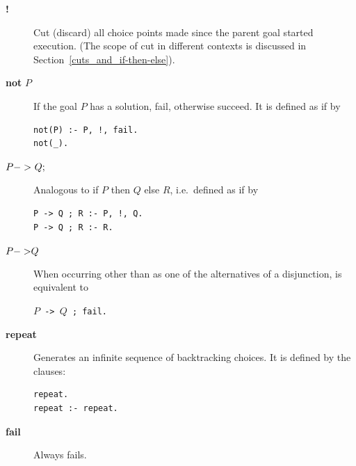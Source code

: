 \begin{description}
\item[{\bf !}] 
    Cut (discard) all choice points made since the parent goal
    started execution.
    (The scope of cut in different contexts is discussed
    in Section~\ref{cuts_and_if-then-else}).

\item[{\bf not} $P$] 
    If the goal $P$ has a solution, fail, otherwise succeed.
    It is defined as if by
\begin{center}
\begin{minipage}{1.75in}
\begin{verbatim}
not(P) :- P, !, fail.
not(_).
\end{verbatim}
\end{minipage}
\end{center}

\item[$P {\tt->}\ Q {\bf ;}$] 
    Analogous to if $P$ then $Q$ else $R$,
    i.e.\ defined as if by
\begin{center}
\begin{minipage}{2.00in}
\begin{verbatim}
P -> Q ; R :- P, !, Q.
P -> Q ; R :- R.
\end{verbatim}
\end{minipage}
\end{center}

\item[$P {\tt ->} Q$] 
    When occurring other than as one of the alternatives of a disjunction,
    is equivalent to
\begin{center}
{\tt $P$ -> $Q$ ; fail.}
\end{center}

\item[{\bf repeat}] 
    Generates an infinite sequence of backtracking choices.
    It is defined by the clauses:
\begin{center}
\begin{minipage}{.75in}
\begin{verbatim}
repeat.
repeat :- repeat.
\end{verbatim}
\end{minipage}
\end{center}

\item[{\bf fail}] 
    Always fails.
\end{description}

